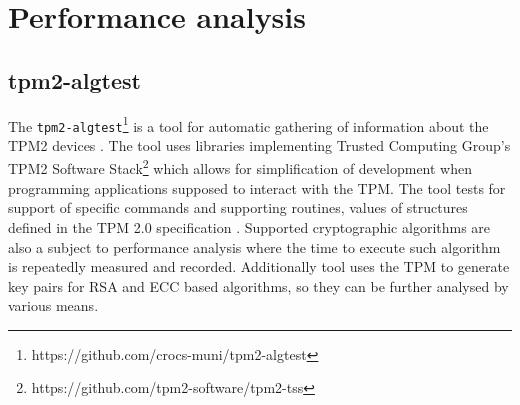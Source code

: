 \section{Performance analysis}
\subsection{tpm2-algtest}
The \texttt{tpm2-algtest}\footnote{https://github.com/crocs-muni/tpm2-algtest} is a tool for automatic gathering of information about the TPM2 devices \cite{Struk2019thesis}. The tool uses libraries implementing Trusted Computing Group's TPM2 Software Stack\footnote{https://github.com/tpm2-software/tpm2-tss} which allows for simplification of development when programming applications supposed to interact with the TPM. The tool tests for support of specific commands and supporting routines, values of structures defined in the TPM 2.0 specification \cite{tcg_p3_commands, tcg_p4_supproutines, tcg_p2_structures}. Supported cryptographic algorithms are also a subject to performance analysis where the time to execute such algorithm is repeatedly measured and recorded. Additionally tool uses the TPM to generate key pairs for RSA and ECC based algorithms, so they can be further analysed by various means.
